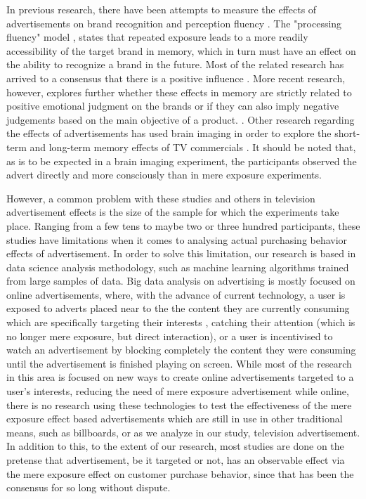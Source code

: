 \documentclass[review]{elsarticle}
\begin{document}
In previous research, there have been attempts to measure the effects of advertisements on brand recognition and perception fluency \cite{14}.  The "processing fluency" model \cite{18}, states that repeated exposure leads to a more readily accessibility of the target brand in memory, which in turn must have an effect on the ability to recognize a brand in the future. Most of the related research has arrived to a consensus that there is a positive influence \cite{19, 20}. More recent research, however, explores further whether these effects in memory are strictly related to positive emotional judgment on the brands or if they can also imply negative judgements based on the main objective of a product. \cite{21}. Other research regarding the effects of advertisements has used brain imaging in order to explore the short-term and long-term memory effects of TV commercials \cite{23}. It should be noted that, as is to be expected in a brain imaging experiment, the participants observed the advert directly and more consciously than in mere exposure experiments.

However, a common problem with these studies and others in television advertisement effects is the size of the sample for which the experiments take place. Ranging from a few tens to maybe two or three hundred participants, these studies have limitations when it comes to analysing actual purchasing behavior effects of advertisement. In order to solve this limitation, our research is based in data science analysis methodology, such as machine learning algorithms trained from large samples of data. Big data analysis on advertising is mostly focused on online advertisements, \cite{24} where, with the advance of current technology, a user is exposed to adverts placed near to the the content they are currently consuming which are specifically targeting their interests \cite[e.g.][]{25,26}, catching their attention (which is no longer mere exposure, but direct interaction), or a
user is incentivised to watch an advertisement by blocking completely the content they were consuming until the advertisement is finished playing on screen. While most of the research in this area is focused on new ways to create online advertisements targeted to a user's interests, reducing the need of mere exposure advertisement while online, there is no research using these technologies to test the effectiveness of the mere exposure effect based advertisements which are still in use in other traditional means, such as billboards, or as we analyze in our study, television advertisement. In addition to this, to the extent of our research, most studies are done on the pretense that advertisement, be it targeted or not, has an observable effect via the mere exposure effect on customer purchase behavior, since that has been the consensus for so long without dispute.
\end{document}
